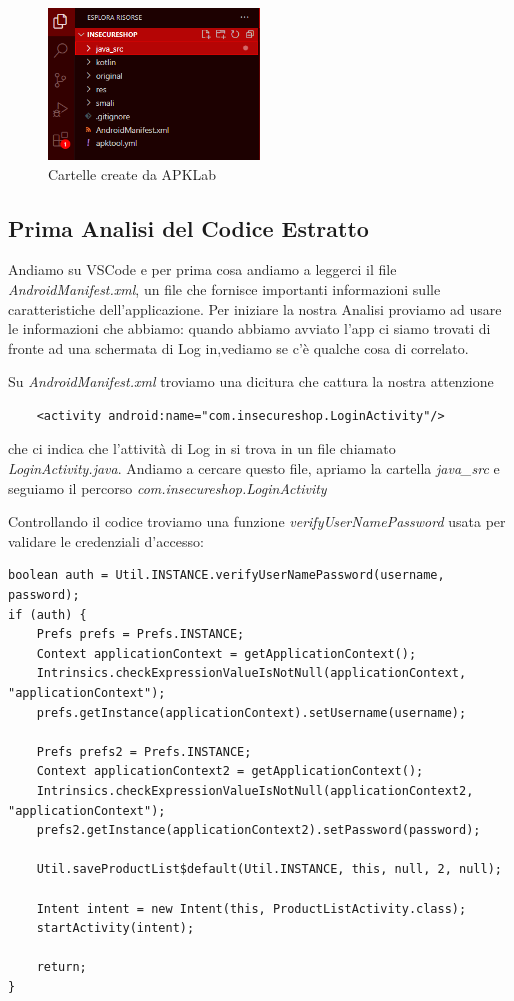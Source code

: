 \documentclass{article}
\begin{document}
\begin{figure}[htp]
\centering
\includegraphics[width=0.5\textwidth]{./insecureshop/esploraRis.png}
\captionsetup{labelformat=empty}
\caption{Cartelle create da APKLab}
\label{fig:esplRis}
\end{figure}
\newpage
\subsection{Prima Analisi del Codice Estratto}
Andiamo su VSCode e per prima cosa andiamo a leggerci il file \emph{AndroidManifest.xml}, 
un file che fornisce importanti informazioni sulle caratteristiche dell'applicazione.
Per iniziare la nostra Analisi proviamo ad usare le informazioni che abbiamo: quando abbiamo avviato l'app 
ci siamo trovati di fronte ad una schermata di Log in,vediamo se c'è qualche cosa di correlato.

Su \emph{AndroidManifest.xml} troviamo una dicitura che cattura la nostra attenzione
\begin{verbatim}
    <activity android:name="com.insecureshop.LoginActivity"/>
\end{verbatim}
che ci indica che l'attività di Log in si trova in un file chiamato \textit{LoginActivity.java}.
Andiamo a cercare questo file, apriamo la cartella \textit{java\_src} e seguiamo il percorso \textit{com.insecureshop.LoginActivity}

Controllando il codice troviamo una funzione \textit{verifyUserNamePassword} usata per validare le credenziali d'accesso:

\begin{lstlisting}[style=JavaStyle]
boolean auth = Util.INSTANCE.verifyUserNamePassword(username, password);
if (auth) {
    Prefs prefs = Prefs.INSTANCE;
    Context applicationContext = getApplicationContext();
    Intrinsics.checkExpressionValueIsNotNull(applicationContext, "applicationContext");
    prefs.getInstance(applicationContext).setUsername(username);

    Prefs prefs2 = Prefs.INSTANCE;
    Context applicationContext2 = getApplicationContext();
    Intrinsics.checkExpressionValueIsNotNull(applicationContext2, "applicationContext");
    prefs2.getInstance(applicationContext2).setPassword(password);

    Util.saveProductList$default(Util.INSTANCE, this, null, 2, null);

    Intent intent = new Intent(this, ProductListActivity.class);
    startActivity(intent);

    return;
}
\end{lstlisting}
\end{document}
